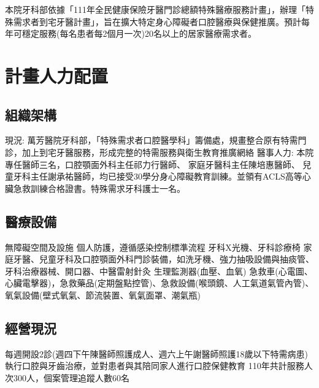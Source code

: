 
本院牙科部依據「111年全民健康保險牙醫門診總額特殊醫療服務計畫」，辦理「特殊需求者到宅牙醫計畫」，旨在擴大特定身心障礙者口腔醫療與保健推廣。預計每年可穩定服務(每名患者每2個月一次)20名以上的居家醫療需求者。

\section{計畫人力配置}

\subsection{組織架構}
\begin{outline}

\1 現況: 萬芳醫院牙科部，「特殊需求者口腔醫學科」籌備處，規畫整合原有特需門診，加上到宅牙醫服務，形成完整的特需服務與衛生教育推廣網絡
\1 醫事人力: %
本院專任醫師三名，口腔顎面外科主任祁力行醫師、
家庭牙醫科主任陳培惠醫師、
兒童牙科主任謝承祐醫師，均已接受30學分身心障礙教育訓練。並領有ACLS高等心臟急救訓練合格證書。特殊需求牙科護士一名。
\end{outline}

\subsection{醫療設備}

\begin{outline}
\1 無障礙空間及設施
\1 個人防護，遵循感染控制標準流程
\1 牙科X光機、牙科診療椅
\1 家庭牙醫、兒童牙科及口腔顎面外科門診裝備，如洗牙機、強力抽吸設備與抽痰管、牙科治療器械、開口器、中醫雷射針灸
\1 生理監測器(血壓、血氧)
\1 急救車(心電圖、心臟電擊器)，急救藥品(定期盤點控管)、急救設備(喉頭鏡、人工氣道氣管內管)、氧氣設備(壁式氧氣、節流裝置、氧氣面罩、潮氣瓶)
\end{outline}

\subsection{經營現況}

\begin{outline}
\1 每週開設2診(週四下午陳醫師照護成人、週六上午謝醫師照護18歲以下特需病患)
\1 執行口腔與牙齒治療，並對患者與其陪同家人進行口腔保健教育
\1 110年共計服務人次300人，個案管理追蹤人數60名
\end{outline}


